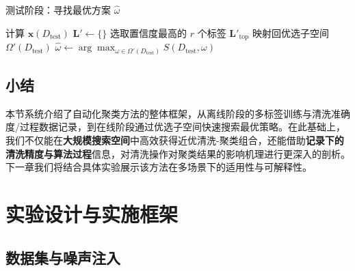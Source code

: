 \documentclass[10pt]{article} %
\numberwithin{equation}{section}
\begin{document}
\begin{algorithm}[t]
\caption{测试阶段：寻找最优方案 \(\hat{\omega}\)}
\label{alg:test-phase}

计算 $\mathbf{x}(D_{\text{test}})$\;
$\mathbf{L}' \leftarrow \{\}$\;
选取置信度最高的 $r$ 个标签 $\mathbf{L}'_{\mathrm{top}}$\;
映射回优选子空间 $\Omega'(D_{\text{test}})$\;
$\hat{\omega} \leftarrow \arg\max_{\omega \in \Omega'(D_{\text{test}})}S(D_{\text{test}}, \omega)$\;
\KwRet{$\hat{\omega}$}
\end{algorithm}

\subsection{小结}
本节系统介绍了自动化聚类方法的整体框架，从离线阶段的多标签训练与清洗准确度/过程数据记录，到在线阶段通过优选子空间快速搜索最优策略。在此基础上，我们不仅能在\textbf{大规模搜索空间}中高效获得近优清洗-聚类组合，还能借助\textbf{记录下的清洗精度与算法过程}信息，对清洗操作对聚类结果的影响机理进行更深入的剖析。下一章我们将结合具体实验展示该方法在多场景下的适用性与可解释性。


\section{实验设计与实施框架}

\subsection{数据集与噪声注入}
\label{sec:datasets}
\end{document}
